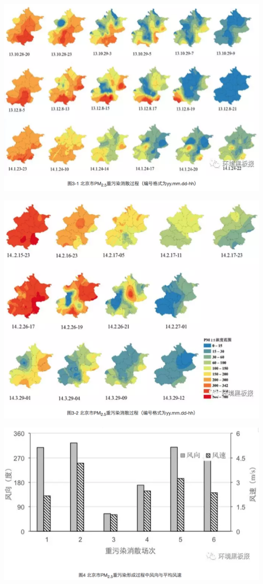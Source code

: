 \documentclass[
]{book}
\begin{document}
\includegraphics[width=8.33in]{images/windhaze4}

\includegraphics[width=8.33in]{images/windhaze5}

\includegraphics[width=8.33in]{images/windhaze6}
\end{document}
